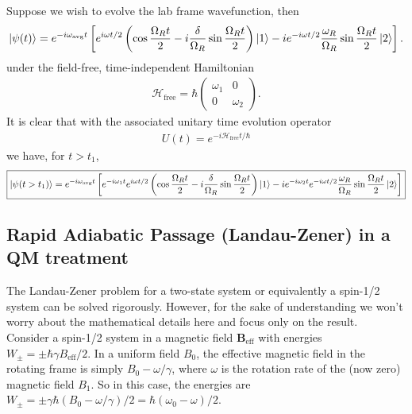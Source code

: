 \documentclass{book}
\theoremstyle{definition}
\newcommand{\ham}{\mathcal{H}}
\newcommand{\f}[2]{\frac{#1}{#2}}
\newcommand{\lp}{\left(}
\newcommand{\rp}{\right)}
\newcommand{\lb}{\left[}
\newcommand{\rb}{\right]}
\begin{document}
	
	
	Suppose we wish to evolve the lab frame wavefunction, then
	\begin{align*}
		\ket{\psi(t)} = e^{-i\omega_\text{avg}t }\lb e^{i\omega t/2} \lp \cos\f{\Omega_R t}{2} - i\f{\delta}{\Omega_R} \sin\f{\Omega_R t}{2}   \rp \ket{1} - i e^{-i\omega t/2}\f{\omega_R}{\Omega_R} \sin\f{\Omega_R t}{2} \ket{2}\rb.
	\end{align*}
	under the field-free, time-independent Hamiltonian 
	\begin{align*}
		\ham_\text{free} = \hbar \begin{pmatrix}
			\omega_1 & 0 \\ 0 & \omega_2
		\end{pmatrix}.
	\end{align*}
	It is clear that with the associated unitary time evolution operator
	\begin{align*}
		U(t) = e^{-i \ham_\text{free} t /\hbar} 
	\end{align*}
	we have, for $t > t_1$,
	\begin{align*}
		\boxed{\ket{\psi(t > t_1)} = e^{-i\omega_\text{avg}t }\lb e^{-i\omega_1 t} e^{i\omega t/2} \lp \cos\f{\Omega_R t}{2} - i\f{\delta}{\Omega_R} \sin\f{\Omega_R t}{2}   \rp \ket{1} - i e^{-i\omega_2 t} e^{-i\omega t/2}\f{\omega_R}{\Omega_R} \sin\f{\Omega_R t}{2} \ket{2}\rb}
	\end{align*}





\subsection{Rapid Adiabatic Passage (Landau-Zener) in a QM treatment}

The Landau-Zener problem for a two-state system or equivalently a spin-1/2 system can be solved rigorously. However, for the sake of understanding we won't worry about the mathematical details here and focus only on the result. \\


Consider a spin-1/2 system in a magnetic field $\bm{B}_\text{eff}$ with energies $W_\pm = \pm \hbar \gamma B_\text{eff}/2$. In a uniform field $B_0$, the effective magnetic field in the rotating frame is simply $B_0 - \omega/\gamma$, where $\omega$ is the rotation rate of the (now zero) magnetic field $B_1$. So in this case, the energies are $W_\pm = \pm \gamma \hbar (B_0 - \omega/\gamma)/2 = \hbar(\omega_0 - \omega)/2$.\\
\end{document}
